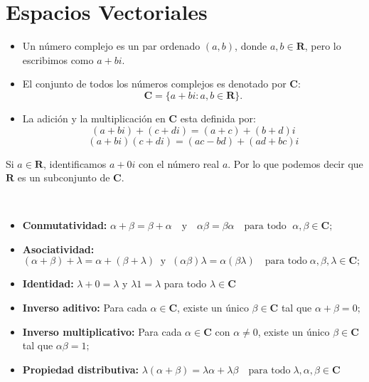 \chapter{Espacios Vectoriales}


    \begin{mydef} \hfill
	\begin{itemize}
	    \item Un número complejo es un par ordenado $(a,b)$, donde $a,b\in \textbf{R}$, pero lo escribimos como $a+bi$.
	    \item El conjunto de todos los números complejos es denotado por $\textbf{C}$:
		$$\textbf{C}=\lbrace a+bi:a,b\in \textbf{R}\rbrace.$$

	    \item La adición y la multiplicación en $\textbf{C}$ esta definida por:
		$$(a+bi)+(c+di)=(a+c)+(b+d)i$$
		$$(a+bi)(c+di)=(ac-bd)+(ad+bc)i$$
	\end{itemize}
    \end{mydef}

Si $a\in \textbf{R}$, identificamos $a+0i$ con el número real $a$. Por lo que podemos decir que $\textbf{R}$ es un subconjunto de $\textbf{C}.$

\setcounter{mydef}{2}
    \begin{mydef}\;\\
	\begin{itemize}
	    \item \textbf{Conmutatividad:}\;
		$\alpha + \beta = \beta + \alpha\quad \mbox{y}\quad \alpha \beta = \beta \alpha \quad \mbox{para todo }\; \alpha,\beta \in \textbf{C};$

	    \item \textbf{Asociatividad:}\;
		$(\alpha + \beta )+\lambda = \alpha + (\beta + \lambda) \;\;\mbox{y}\;\; (\alpha\beta)\lambda =\alpha(\beta\lambda) \quad \mbox{para todo}\; \alpha,\beta,\lambda \in \textbf{C};$

	    \item \textbf{Identidad:}\;
		$\lambda +0=\lambda $ y $\lambda 1 = \lambda$ para todo $\lambda \in \textbf{C}$

	    \item \textbf{Inverso aditivo:}\;
		    Para cada $\alpha \in \textbf{C}$, existe un único $\beta \in \textbf{C}$ tal que $\alpha + \beta = 0;$

	    \item \textbf{Inverso multiplicativo:}\;
		    Para cada $\alpha \in \textbf{C}$ con $\alpha \neq 0$, existe un único $\beta \in \textbf{C}$ tal que $\alpha \beta = 1;$

	    \item \textbf{Propiedad distributiva:}\;
		$\lambda (\alpha + \beta) = \lambda \alpha + \lambda \beta \quad \mbox{para todo}\; \lambda, \alpha, \beta \in \textbf{C}$
	\end{itemize}
    \end{mydef}

